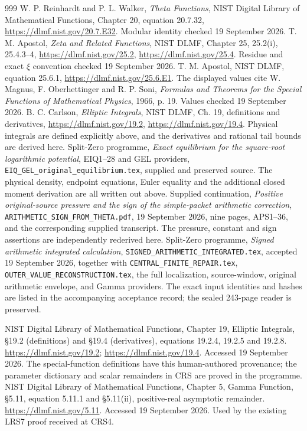 \begin{thebibliography}{999}
 W. P. Reinhardt and P. L. Walker,
\emph{Theta Functions}, NIST Digital Library of Mathematical Functions,
Chapter 20, equation 20.7.32,
\url{https://dlmf.nist.gov/20.7.E32}. Modular identity checked 19 September 2026.
 T. M. Apostol, \emph{Zeta and Related Functions}, NIST DLMF,
Chapter 25, 25.2(i), 25.4.3--4,
\url{https://dlmf.nist.gov/25.2}, \url{https://dlmf.nist.gov/25.4}.
Residue and exact $\xi$ convention checked 19 September 2026.
 T. M. Apostol, NIST DLMF, equation 25.6.1,
\url{https://dlmf.nist.gov/25.6.E1}. The displayed values cite
W. Magnus, F. Oberhettinger and R. P. Soni,
\emph{Formulas and Theorems for the Special Functions of Mathematical Physics},
1966, p. 19. Values checked 19 September 2026.
 B. C. Carlson, \emph{Elliptic Integrals}, NIST DLMF,
Ch. 19, definitions and derivatives, \url{https://dlmf.nist.gov/19.2},
\url{https://dlmf.nist.gov/19.4}. Physical integrals are defined explicitly
above, and the derivatives and rational tail bounds are derived here.
 Split-Zero programme, \emph{Exact equilibrium for the
square-root logarithmic potential}, EIQ1--28 and GEL providers,
\texttt{EIQ\_GEL\_original\_equilibrium.tex}, supplied and preserved source.
The physical density, endpoint equations, Euler equality and the
additional closed moment derivation are all written out above.
 Supplied continuation, \emph{Positive original-source
pressure and the sign of the simple-packet arithmetic correction},
\texttt{ARITHMETIC\_SIGN\_FROM\_THETA.pdf}, 19 September 2026, nine pages,
APS1--36, and the corresponding supplied transcript. The pressure,
constant and sign assertions are independently rederived here.
 Split-Zero programme, \emph{Signed arithmetic integrated
calculation}, \texttt{SIGNED\_ARITHMETIC\_INTEGRATED.tex}, accepted
19 September 2026, together with \texttt{CENTRAL\_FINITE\_REPAIR.tex},
\texttt{OUTER\_VALUE\_RECONSTRUCTION.tex}, the full localization, source-window,
original arithmetic envelope, and Gamma providers. The exact input
identities and hashes are listed in the accompanying acceptance record;
the sealed 243-page reader is preserved.

NIST Digital Library of Mathematical Functions, Chapter 19,
Elliptic Integrals, \S19.2 (definitions) and \S19.4 (derivatives),
equations 19.2.4, 19.2.5 and 19.2.8.
\url{https://dlmf.nist.gov/19.2};
\url{https://dlmf.nist.gov/19.4}.
Accessed 19 September 2026. The special-function definitions have
this human-authored provenance; the parameter dictionary and scalar
remainders in CRS are proved in the programme.
NIST Digital Library of Mathematical Functions, Chapter 5,
Gamma Function, \S5.11, equation 5.11.1 and \S5.11(ii),
positive-real asymptotic remainder.
\url{https://dlmf.nist.gov/5.11}.
Accessed 19 September 2026. Used by the existing LRS7 proof received
at CRS4.


\end{thebibliography}
